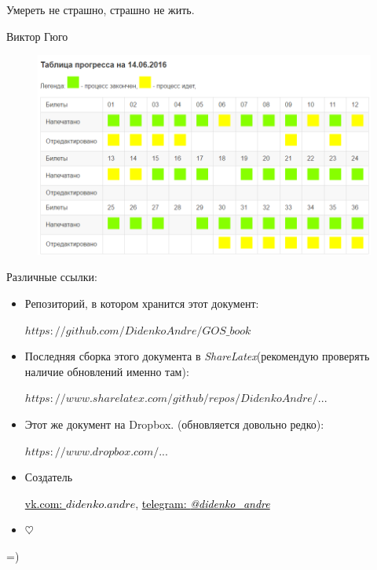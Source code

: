 \epigraph{Умереть не страшно, страшно не жить.}{Виктор Гюго}

\begin{figure}[h!]
\includegraphics[width=\textwidth]{pictures/progress}
\end{figure}

\mbox{}

Различные ссылки:
\begin{itemize}
\item

Репозиторий, в котором хранится этот документ:

\href{https://github.com/DidenkoAndre/GOS_book}{$https://github.com/DidenkoAndre/GOS\_book$}

\item
Последняя сборка этого документа в \textit{ShareLatex}\newline (рекомендую проверять наличие обновлений именно там): 

\href{https://www.sharelatex.com/github/repos/DidenkoAndre/GOS_book/builds/latest/output.pdf}{$https://www.sharelatex.com/github/repos/DidenkoAndre/...$}

\item

Этот же документ на Dropbox.  \newline (обновляется довольно редко):

\href{https://www.dropbox.com/sh/7e5mfj8q68o2ipp/AAD8XvpZhiJzFbEh_IeH305ia?dl=0&preview=GOSMat.pdf}{$https://www.dropbox.com/...$}

\item
Создатель

\href{https://vk.com/didenko.andre}{\textcolor{black}{vk.com: \textcolor{Purplemountainmajesty}{$didenko.andre$}}},
\href{https://telegram.me/didenko_andre}{\textcolor{black}{telegram: \textcolor{Purplemountainmajesty}{\textit{@didenko_andre}}}}

\item

$\heartsuit$
\end{itemize}
=)